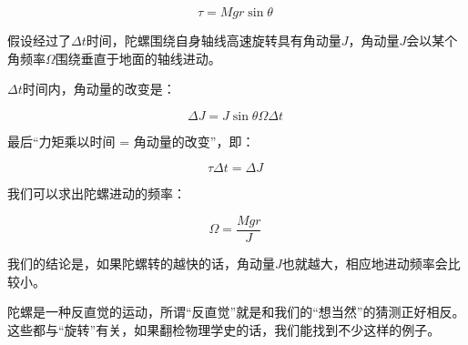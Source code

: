 \begin{equation}
\tau = Mg r \sin \theta~
\end{equation}

假设经过了$\Delta t$时间，陀螺围绕自身轴线高速旋转具有角动量$J$，角动量$J$会以某个角频率$\Omega$围绕垂直于地面的轴线进动。

$\Delta t$时间内，角动量的改变是：

\begin{equation}
\Delta J = J \sin \theta \Omega \Delta t~
\end{equation}

最后“力矩乘以时间 = 角动量的改变”，即：

\begin{equation}
\tau \Delta t = \Delta J~
\end{equation}

我们可以求出陀螺进动的频率：

\begin{equation}
\Omega = \frac{Mg r}{J}~
\end{equation}

我们的结论是，如果陀螺转的越快的话，角动量$J$也就越大，相应地进动频率会比较小。

陀螺是一种反直觉的运动，所谓“反直觉”就是和我们的“想当然”的猜测正好相反。这些都与“旋转”有关，如果翻检物理学史的话，我们能找到不少这样的例子。


